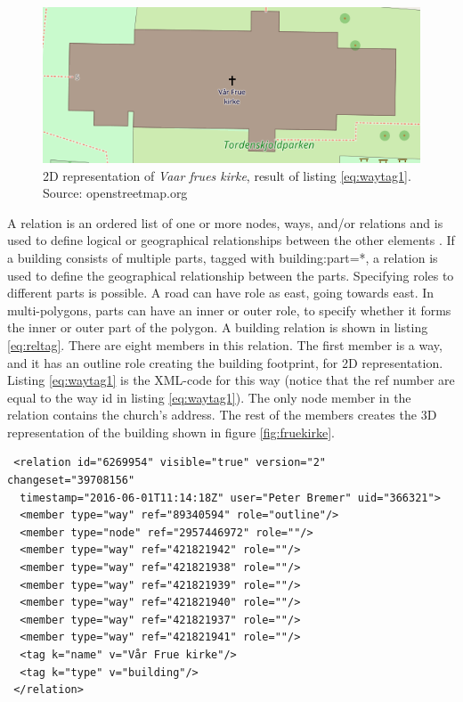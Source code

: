 \begin{figure}[H]
    \centering
    \includegraphics[scale=0.5]{figures/FixedByMe/fruekirke2D.png}
    \caption{2D representation of \textit{Vaar frues kirke}, result of listing \ref{eq:waytag1}. Source: openstreetmap.org}
    \label{fig:fruekirke2D}
\end{figure}

A relation is an ordered list of one or more nodes, ways, and/or relations and is used to define logical or geographical relationships between the other elements \cite{OpenStreetMape}. If a building consists of multiple parts, tagged with building:part=*, a relation is used to define the geographical relationship between the parts. Specifying roles to different parts is possible. A road can have role as east, going towards east. In multi-polygons, parts can have an inner or outer role, to specify whether it forms the inner or outer part of the polygon. A building relation is shown in listing \ref{eq:reltag}. There are eight members in this relation. The first member is a way, and it has an outline role creating the building footprint, for 2D representation. Listing \ref{eq:waytag1} is the XML-code for this way (notice that the ref number are equal to the way id in listing \ref{eq:waytag1}). The only node member in the relation contains the church's address. The rest of the members creates the 3D representation of the building shown in figure \ref{fig:fruekirke}.

\begin{lstlisting}
 <relation id="6269954" visible="true" version="2" changeset="39708156" 
  timestamp="2016-06-01T11:14:18Z" user="Peter Bremer" uid="366321">
  <member type="way" ref="89340594" role="outline"/>
  <member type="node" ref="2957446972" role=""/>
  <member type="way" ref="421821942" role=""/>
  <member type="way" ref="421821938" role=""/>
  <member type="way" ref="421821939" role=""/>
  <member type="way" ref="421821940" role=""/>
  <member type="way" ref="421821937" role=""/>
  <member type="way" ref="421821941" role=""/>
  <tag k="name" v="Vår Frue kirke"/>
  <tag k="type" v="building"/>
 </relation>
\end{lstlisting}

